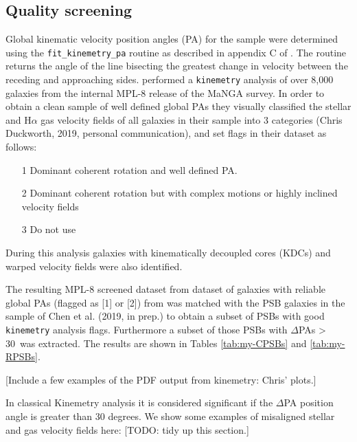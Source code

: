 \subsection{Quality screening}
Global kinematic velocity position angles (PA) for the sample were determined using the \texttt{fit\_kinemetry\_pa} routine as described in appendix C of \cite{2006MNRAS.366..787K}. The routine returns the angle of the line bisecting the greatest change in velocity between the receding and approaching sides. \cite{2019MNRAS.483..172D} performed a \texttt{kinemetry} analysis of over 8,000 galaxies from the internal MPL-8 release of the MaNGA survey. In order to obtain a clean sample of well defined global PAs they visually classified the stellar and H$\alpha$ gas velocity fields of all galaxies in their sample into 3 categories (Chris Duckworth, 2019, personal communication), and set flags in their dataset as follows:

\begin{itemize}
    \item [1] Dominant coherent rotation and well defined PA. 
    \item [2] Dominant coherent rotation but with complex motions or highly inclined velocity fields 
    \item [3] Do not use
\end{itemize}

During this analysis galaxies with kinematically decoupled cores (KDCs) and warped velocity fields were also identified.

The resulting MPL-8 screened dataset from dataset of galaxies with reliable global PAs (flagged as [1] or [2]) from \cite{2019MNRAS.483..172D} was matched with the PSB galaxies in the sample of Chen et al. (2019, in prep.) to obtain a subset of PSBs with good \texttt{kinemetry} analysis flags. Furthermore a subset of those PSBs with $\Delta$PAs > 30\textdegree\ was extracted. The results are shown in Tables \ref{tab:my-CPSBs} and \ref{tab:my-RPSBs}. 

[Include a few examples of the PDF output from kinemetry: Chris' plots.]

In classical Kinemetry analysis it is considered significant if the $\Delta$PA position angle is greater than 30 degrees. We show some examples of misaligned stellar and gas velocity fields here: 
[TODO: tidy up this section.]

